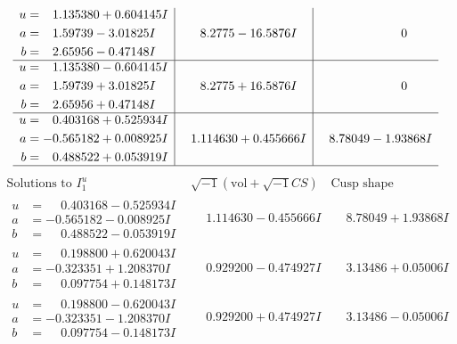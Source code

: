 \documentclass[1p]{elsarticle_modified}
\theoremstyle{definition}
\newcommand{\I}{\sqrt{-1}}
\begin{document}
$$\begin{array}{c|c|c}
\begin{aligned}
u &= \phantom{-}1.135380 + 0.604145 I \\
a &= \phantom{-}1.59739 - 3.01825 I \\
b &= \phantom{-}2.65956 - 0.47148 I\end{aligned}
 & \phantom{-}8.2775 - 16.5876 I & \phantom{-0.000000 } 0 \\ \hline\begin{aligned}
u &= \phantom{-}1.135380 - 0.604145 I \\
a &= \phantom{-}1.59739 + 3.01825 I \\
b &= \phantom{-}2.65956 + 0.47148 I\end{aligned}
 & \phantom{-}8.2775 + 16.5876 I & \phantom{-0.000000 } 0 \\ \hline\begin{aligned}
u &= \phantom{-}0.403168 + 0.525934 I \\
a &= -0.565182 + 0.008925 I \\
b &= \phantom{-}0.488522 + 0.053919 I\end{aligned}
 & \phantom{-}1.114630 + 0.455666 I & \phantom{-}8.78049 - 1.93868 I\\
 \hline 
 \end{array}$$\newpage$$\begin{array}{c|c|c}  
\text{Solutions to }I^u_{1}& \I (\text{vol} + \sqrt{-1}CS) & \text{Cusp shape}\\
 \hline 
\begin{aligned}
u &= \phantom{-}0.403168 - 0.525934 I \\
a &= -0.565182 - 0.008925 I \\
b &= \phantom{-}0.488522 - 0.053919 I\end{aligned}
 & \phantom{-}1.114630 - 0.455666 I & \phantom{-}8.78049 + 1.93868 I \\ \hline\begin{aligned}
u &= \phantom{-}0.198800 + 0.620043 I \\
a &= -0.323351 + 1.208370 I \\
b &= \phantom{-}0.097754 + 0.148173 I\end{aligned}
 & \phantom{-}0.929200 - 0.474927 I & \phantom{-}3.13486 + 0.05006 I \\ \hline\begin{aligned}
u &= \phantom{-}0.198800 - 0.620043 I \\
a &= -0.323351 - 1.208370 I \\
b &= \phantom{-}0.097754 - 0.148173 I\end{aligned}
 & \phantom{-}0.929200 + 0.474927 I & \phantom{-}3.13486 - 0.05006 I \\ \hline\begin{aligned}

\end{aligned}
\end{array}$$
\end{document}
